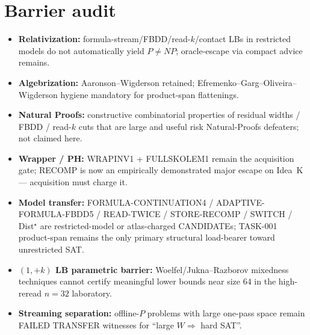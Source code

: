 \documentclass[11pt]{article}
\begin{document}
\section*{Barrier audit}
\begin{itemize}
\item \textbf{Relativization:} formula-stream/FBDD/read-$k$/contact LBs in restricted models do not
  automatically yield $P\neq NP$; oracle-escape via compact advice remains.
\item \textbf{Algebrization:} Aaronson--Wigderson retained; Efremenko--Garg--Oliveira--Wigderson
  hygiene mandatory for product-span flattenings.
\item \textbf{Natural Proofs:} constructive combinatorial properties of residual widths / FBDD /
  read-$k$ cuts that are large and useful risk Natural-Proofs defeaters; not claimed here.
\item \textbf{Wrapper / PH:} WRAPINV1 + FULLSKOLEM1 remain the acquisition gate;
  RECOMP is now an empirically demonstrated major escape on Idea~K --- acquisition must charge it.
\item \textbf{Model transfer:} FORMULA-CONTINUATION4 / ADAPTIVE-FORMULA-FBDD5 / READ-TWICE /
  STORE-RECOMP / SWITCH / Dist$^\star$ are restricted-model or atlas-charged CANDIDATEs;
  TASK-001 product-span remains the only primary structural load-bearer toward unrestricted SAT.
\item \textbf{$(1,+k)$ LB parametric barrier:} Woelfel/Jukna--Razborov mixedness techniques
  cannot certify meaningful lower bounds near size $64$ in the high-reread $n=32$ laboratory.
\item \textbf{Streaming separation:} offline-$P$ problems with large one-pass space remain
  FAILED TRANSFER witnesses for ``large $W\Rightarrow$ hard SAT''.
\end{itemize}
\end{document}
